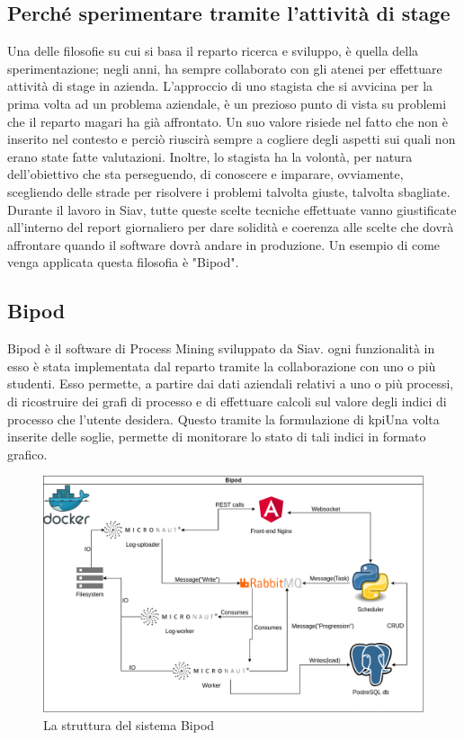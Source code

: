 \subsection{Perché sperimentare tramite l'attività di stage}
Una delle filosofie su cui si basa il reparto ricerca e sviluppo, è quella della sperimentazione; negli anni, ha sempre collaborato con gli atenei per effettuare attività di stage in azienda. L'approccio di uno stagista che si avvicina per la prima volta ad un problema aziendale, è un prezioso punto di vista su problemi che il reparto magari ha già affrontato. Un suo valore risiede nel fatto che non è inserito nel contesto e perciò riuscirà sempre a cogliere degli aspetti sui quali non erano state fatte valutazioni. Inoltre, lo stagista ha la volontà, per natura dell'obiettivo che sta perseguendo, di conoscere e imparare, ovviamente, scegliendo delle strade per risolvere i problemi talvolta giuste, talvolta sbagliate. Durante il lavoro in Siav, tutte queste scelte tecniche effettuate vanno giustificate all'interno del report giornaliero per dare solidità e coerenza alle scelte che dovrà affrontare quando il software dovrà andare in produzione. Un esempio di come venga applicata questa filosofia è "Bipod".
\subsection{Bipod}
Bipod è il software di Process Mining sviluppato da Siav. ogni funzionalità in esso è stata implementata dal reparto tramite la collaborazione con uno o più studenti. Esso permette, a partire dai dati aziendali relativi a uno o più processi, di ricostruire dei grafi di processo e di effettuare calcoli sul valore degli indici di processo che l'utente desidera. Questo tramite la formulazione di \acrshort{kpi}\glsfirstoccur Una volta inserite delle soglie, permette di monitorare lo stato di tali indici in formato grafico.
\begin{figure}[H]
    \centering
    \includegraphics[width=\columnwidth]{immagini/Bipod docker scheme.png}
    \caption{La struttura del sistema Bipod}
    \label{fig:bipodMessages}
\end{figure}

